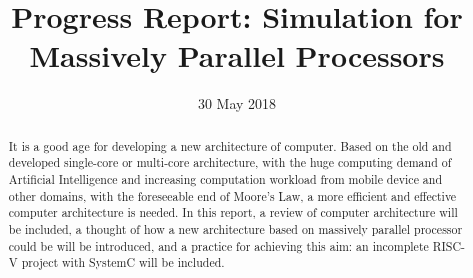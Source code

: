 \documentclass{ecsprogress}
\begin{document}
\frontmatter 

\title{Progress Report: Simulation for Massively Parallel Processors}
\addresses  {\groupname\\\deptname\\\univname}
\date{30 May 2018}
\subject    {subject}
\maketitle

\begin{abstract}
It is a good age for developing a new architecture of computer\citep{dally1990performance}. Based on the old and developed single-core or multi-core architecture, with the huge computing demand of Artificial Intelligence and increasing computation workload from mobile device and other domains, with the foreseeable end of Moore’s Law, a more efficient and effective computer architecture is needed. In this report, a review of computer architecture will be included, a thought of how a new architecture based on massively parallel processor could be will be introduced, and a practice for achieving this aim: an incomplete RISC-V project with SystemC will be included. 
\end{abstract}

\tableofcontents
\setcounter{tocdepth}{4}
\listoffigures
\listoftables
\mainmatter




\end{document}
